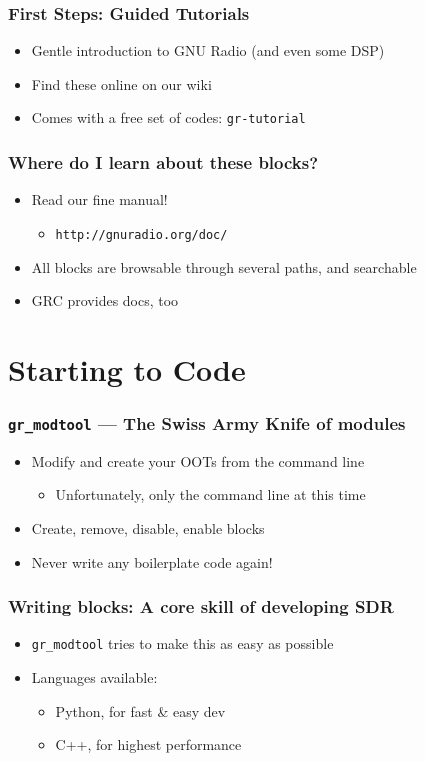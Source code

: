 \documentclass{beamer}
\begin{document}
\begin{frame}
  \frametitle{First Steps: Guided Tutorials}
  \begin{itemize}
    \item Gentle introduction to GNU Radio (and even some DSP)
    \item Find these online on our wiki
    \item Comes with a free set of codes: \texttt{gr-tutorial}
  \end{itemize}
\end{frame}

\begin{frame}
  \frametitle{Where do I learn about these blocks?}
  \begin{itemize}
    \item Read our fine manual!
      \begin{itemize}
        \item \texttt{http://gnuradio.org/doc/}
      \end{itemize}
    \item All blocks are browsable through several paths, and searchable
    \item GRC provides docs, too
  \end{itemize}
\end{frame}

\section{Starting to Code}
\begin{frame}[fragile]
  \frametitle{\texttt{gr\_modtool} --- The Swiss Army Knife of modules}
  \begin{itemize}
    \item Modify and create your OOTs from the command line
      \begin{itemize}
        \item Unfortunately, only the command line at this time
      \end{itemize}
    \item Create, remove, disable, enable blocks
    \item Never write any boilerplate code again!
  \end{itemize}
\end{frame}

\begin{frame}
  \frametitle{Writing blocks: A core skill of developing SDR}
  \begin{itemize}
    \item \texttt{gr\_modtool} tries to make this as easy as possible
    \item Languages available:
      \begin{itemize}
        \item Python, for fast \& easy dev
        \item C++, for highest performance
      \end{itemize}
  \end{itemize}
\end{frame}
\end{document}
